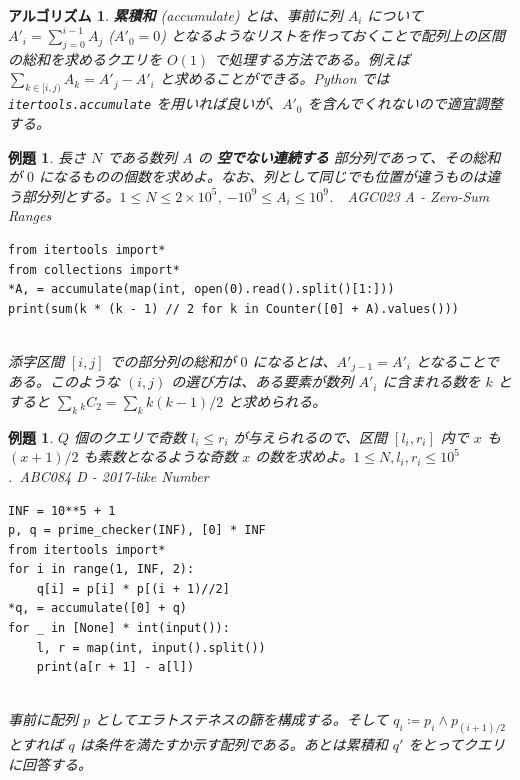 \documentclass[12pt, a4j]{ltjsarticle}
\newtheorem{alg}[thm]{アルゴリズム}
\newtheorem{exm}[thm]{例題}
\begin{document}
\newpage

\begin{alg}{\bf 累積和} (accumulate) とは、事前に列 $A_i$ について\upshape $A'_i = \displaystyle\sum_{j=0}^{i-1} A_j$ ($A'_0 = 0$) となるようなリストを作っておくことで配列上の区間の総和を求めるクエリを $O(1)$ で処理する方法である。例えば $\displaystyle\sum_{k\in[i,j)} A_k = A'_j - A'_i$ と求めることができる。Python では \lstinline{itertools.accumulate} を用いれば良いが、$A'_0$ を含んでくれないので適宜調整する。
\end{alg}

\vspace{1cm}

\begin{exm} 長さ $N$ である数列 $A$ の {\bf 空でない連続する} 部分列であって、その総和が $0$ になるものの個数を求めよ。なお、列として同じでも位置が違うものは違う部分列とする。\upshape $1\le N\le 2\times 10^5$, $-10^9\le A_i\le10^9$.\ \ AGC023 A - Zero-Sum Ranges\\
\begin{lstlisting}
from itertools import*
from collections import*
*A, = accumulate(map(int, open(0).read().split()[1:]))
print(sum(k * (k - 1) // 2 for k in Counter([0] + A).values()))
\end{lstlisting}\quad\\
添字区間 $[i,j]$ での部分列の総和が $0$ になるとは、$A'_{j-1} = A'_i$ となることである。このような $(i,j)$ の選び方は、ある要素が数列 $A'_i$ に含まれる数を $k$ とすると $\sum_k{}_kC_2=\sum_kk(k-1)/2$ と求められる。
\end{exm}

\vspace{1cm}

\begin{exm} $Q$ 個のクエリで奇数 $l_i\le r_i$ が与えられるので、区間 $[l_i,r_i]$ 内で $x$ も $(x+1)/2$ も素数となるような奇数 $x$ の数を求めよ。$1\le N, l_i, r_i \le 10^5$.\ \upshape ABC084 D - 2017-like Number\\
\begin{lstlisting}
INF = 10**5 + 1
p, q = prime_checker(INF), [0] * INF
from itertools import*
for i in range(1, INF, 2):
    q[i] = p[i] * p[(i + 1)//2]
*q, = accumulate([0] + q)
for _ in [None] * int(input()):
    l, r = map(int, input().split())
    print(a[r + 1] - a[l])
\end{lstlisting}\quad\\
事前に配列 $p$ としてエラトステネスの篩を構成する。そして $q_i\coloneqq p_i \land p_{(i+1)/2}$ とすれば $q$ は条件を満たすか示す配列である。あとは累積和 $q'$ をとってクエリに回答する。
\end{exm}
\end{document}
